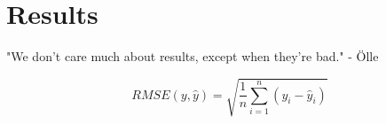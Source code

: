 \section{Results}

"We don't care much about results, except when they're bad." - Ölle


\begin{equation}\label{rmse}
RMSE(y,\hat{y}) = \sqrt{\frac{1}{n}  \sum_{i=1}^{n} (y_i - \hat{y}_i)}
\end{equation}
